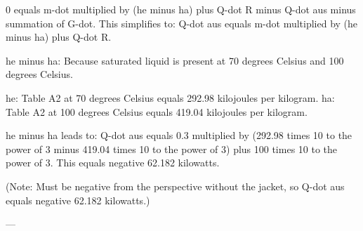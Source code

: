 0 equals m-dot multiplied by (he minus ha) plus Q-dot R minus Q-dot aus minus summation of G-dot.  
This simplifies to:  
Q-dot aus equals m-dot multiplied by (he minus ha) plus Q-dot R.  

he minus ha:  
Because saturated liquid is present at 70 degrees Celsius and 100 degrees Celsius.  

he: Table A2 at 70 degrees Celsius equals 292.98 kilojoules per kilogram.  
ha: Table A2 at 100 degrees Celsius equals 419.04 kilojoules per kilogram.  

he minus ha leads to:  
Q-dot aus equals 0.3 multiplied by (292.98 times 10 to the power of 3 minus 419.04 times 10 to the power of 3) plus 100 times 10 to the power of 3.  
This equals negative 62.182 kilowatts.  

(Note: Must be negative from the perspective without the jacket, so Q-dot aus equals negative 62.182 kilowatts.)  

---
